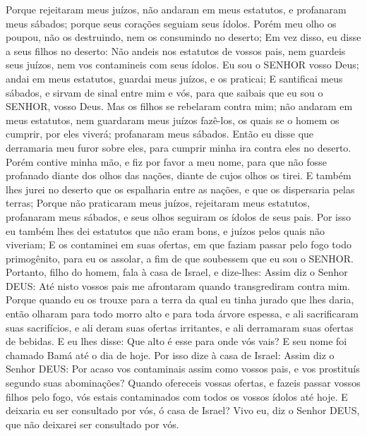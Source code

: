 {  Porque rejeitaram meus juízos, não andaram em meus estatutos, e profanaram meus sábados; porque seus corações seguiam seus ídolos.
  Porém meu olho os poupou, não os destruindo, nem os consumindo no deserto;
  Em vez disso, eu disse a seus filhos no deserto: Não andeis nos estatutos de vossos pais, nem guardeis seus juízos, nem vos contamineis com seus ídolos.
  Eu sou o SENHOR vosso Deus; andai em meus estatutos, guardai meus juízos, e os praticai;
  E santificai meus sábados, e sirvam de sinal entre mim e vós, para que saibais que eu sou o SENHOR, vosso Deus.
  Mas os filhos se rebelaram contra mim; não andaram em meus estatutos, nem guardaram meus juízos fazê-los, os quais se o homem os cumprir, por eles viverá;
{} profanaram meus sábados. Então eu disse que derramaria meu furor sobre eles, para cumprir minha ira contra eles no deserto.
  Porém contive minha mão, e fiz por favor a meu nome, para que não fosse profanado diante dos olhos das nações, diante de cujos olhos os tirei.
  E também lhes jurei no deserto que os espalharia entre as nações, e que os dispersaria pelas terras;
  Porque não praticaram meus juízos, rejeitaram meus estatutos, profanaram meus sábados, e seus olhos seguiram os ídolos de seus pais.
  Por isso eu também lhes dei estatutos que não eram bons, e juízos pelos quais não viveriam;
  E os contaminei em suas ofertas, em que faziam passar pelo fogo todo primogênito, para eu os assolar, a fim de que soubessem que eu sou o SENHOR.
  Portanto, filho do homem, fala à casa de Israel, e dize-lhes: Assim diz o Senhor DEUS: Até nisto vossos pais me afrontaram quando transgrediram contra mim.
  Porque quando eu os trouxe para a terra da qual eu tinha jurado
 que lhes daria, então olharam para todo morro alto e para toda árvore espessa, e ali sacrificaram suas sacrifícios, e ali deram suas ofertas irritantes, e ali derramaram suas ofertas de bebidas.
  E eu lhes disse: Que alto é esse para onde vós vais? E seu nome foi chamado Bamá até o dia de hoje.
  Por isso dize à casa de Israel: Assim diz o Senhor DEUS: Por acaso
{} vos contaminais assim como vossos pais, e vos prostituís segundo suas abominações?
  Quando ofereceis vossas ofertas, e fazeis passar vossos filhos pelo fogo, vós estais contaminados com todos os vossos ídolos até hoje. E deixaria eu ser consultado por vós, ó casa de Israel? Vivo eu, diz o Senhor DEUS, que não deixarei ser consultado por vós.
}
